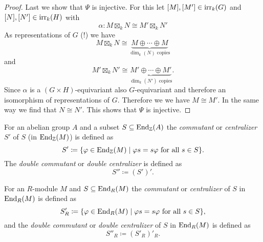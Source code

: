 \begin{proof}
  Last we show that $\Psi$ is injective.
  For this let $[M], [M'] \in \operatorname{irr}_k(G)$ and $[N], [N'] \in \operatorname{irr}_k(H)$ with
  \[
            \alpha
    \colon  M  \boxtimes_k N
    \cong   M' \boxtimes_k N'
  \]
  As representations of $G$ (!) we have
  \[
          M \boxtimes_k N
    \cong \underbrace{ M \oplus \dotsb \oplus M }_{ \dim_k(N) \text{ copies} }
  \]
  and
  \[
          M' \boxtimes_k N'
    \cong \underbrace{ M' \oplus \dotsb \oplus M' }_{ \dim_k(N') \text{ copies} }.
  \]
  Since $\alpha$ is a $(G \times H)$-equivariant also $G$-equivariant and therefore an isomorphism of representations of $G$.
  Therefore we we have $M \cong M'$.
  In the same way we find that $N \cong N'$.
  This shows that $\Psi$ is injective.
\end{proof}


\begin{defi}
  For an abelian group $A$ and a subset $S \subseteq \operatorname{End}_{\mathbb{Z}}(A)$ the \emph{commutant} or \emph{centralizer} $S'$ of $S$ (in $\operatorname{End}_{\mathbb{Z}}(M)$) is defined as
  \[
              S'
    \coloneqq \{
                \varphi \in \operatorname{End}_{\mathbb{Z}}(M)
              \mid
                \varphi s = s \varphi
                \text{ for all }
                s \in S
              \}.
  \]
  The \emph{double commutant} or \emph{double centralizer} is defined as
  \[
    S'' \coloneqq (S')'.
  \]
  
  For an $R$-module $M$ and $S \subseteq \operatorname{End}_R(M)$ the \emph{commutant} or \emph{centralizer} of $S$ in $\operatorname{End}_R(M)$ is defined as
  \[
              S'_R
    \coloneqq \{
                \varphi \in \operatorname{End}_R(M)
              \mid
                \varphi s = s \varphi
                \text{ for all }
                s \in S
              \},
  \]
  and the \emph{double commutant} or \emph{double centralizer} of $S$ in $\operatorname{End}_R(M)$ is defined as
  \[
    S''_R \coloneqq (S'_R)'_R.
  \]
\end{defi}


